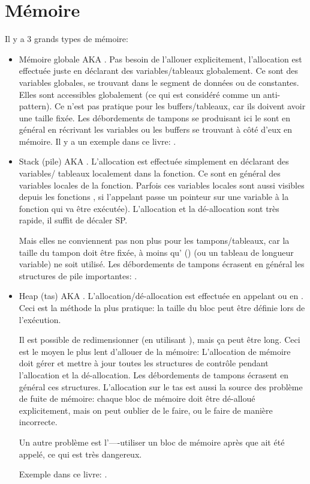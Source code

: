﻿\section{Mémoire}

Il y a 3 grands types de mémoire:

\begin{itemize}
\item
Mémoire globale \ac{AKA} .
Pas besoin de l'allouer explicitement, l'allocation est effectuée juste en déclarant
des variables/tableaux globalement.
Ce sont des variables globales, se trouvant dans le segment de données ou de constantes.
Elles sont accessibles globalement (ce qui est considéré comme un \gls{anti-pattern}).
Ce n'est pas pratique pour les buffers/tableaux, car ils doivent avoir une taille
fixée.
Les débordements de tampons se produisant ici le sont en général en récrivant les
variables ou les buffers se trouvant à côté d'eux en mémoire.
Il y a un exemple dans ce livre: .

\item
Stack (pile) \ac{AKA} .
L'allocation est effectuée simplement en déclarant des variables/ tableaux localement
dans la fonction.
Ce sont en général des variables locales de la fonction.
Parfois ces variables locales sont aussi visibles depuis les fonctions ,
si l'appelant passe un pointeur sur une variable à la fonction 
qui va être exécutée).
L'allocation et la dé-allocation sont très rapide, il suffit de décaler \ac{SP}.

Mais elles ne conviennent pas non plus pour les tampons/tableaux, car la taille du
tampon doit être fixée, à moins qu' () (ou un tableau de
longueur variable) ne soit utilisé.
Les débordements de tampons écrasent en général les structures de pile importantes:
.

\item
Heap (tas) \ac{AKA} .
L'allocation/dé-allocation est effectuée en appelant  ou
 en \Cpp.
Ceci est la méthode la plus pratique: la taille du bloc peut être définie lors de
l'exécution.

Il est possible de redimensionner (en utilisant ), mais ça peut
être long.
Ceci est le moyen le plus lent d'allouer de la mémoire:
L'allocation de mémoire doit gérer et mettre à jour toutes les structures de
contrôle pendant l'allocation et la dé-allocation.
Les débordements de tampons écrasent en général ces structures.
L'allocation sur le tas est aussi la source des problème de fuite de mémoire: chaque
bloc de mémoire doit être dé-alloué explicitement, mais on peut oublier de le faire,
ou le faire de manière incorrecte.

Un autre problème est l'----utiliser un bloc de
mémoire après que   ait été appelé, ce qui est très dangereux.

Exemple dans ce livre: .

\end{itemize}

